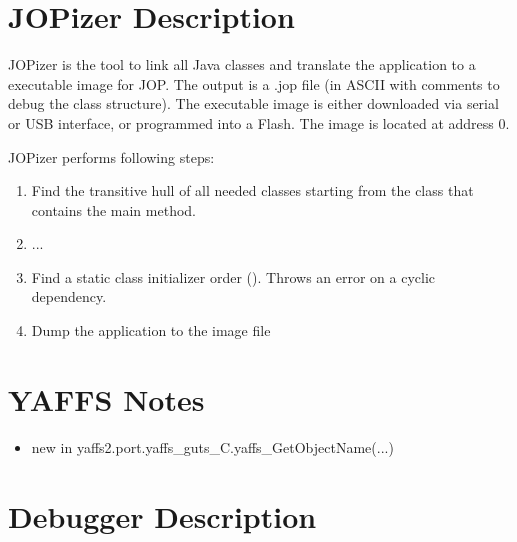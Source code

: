 \section{JOPizer Description}

JOPizer is the tool to link all Java classes and translate the
application to a executable image for JOP. The output is a .jop file
(in ASCII with comments to debug the class structure). The executable
image is either downloaded via serial or USB interface, or programmed
into a Flash. The image is located at address 0.

JOPizer performs following steps:

\begin{enumerate}
    \item Find the transitive hull of all needed classes starting
    from the class that contains the main method.
    \item ...
    \item Find a static class initializer order
    (). Throws an error on a cyclic dependency.
    \item Dump the application to the image file
\end{enumerate}

\section{YAFFS Notes}

\begin{itemize}
    \item new in yaffs2.port.yaffs\_guts\_C.yaffs\_GetObjectName(...)
\end{itemize}

\section{Debugger Description}

